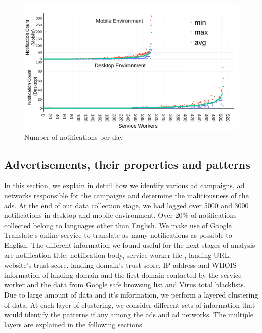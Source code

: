 
\begin{figure}[h]
\includegraphics[width=\columnwidth]{figs/avg_notifications.pdf}
\caption{Number of notifications per day}
\label{notification_per_day}
\end{figure}

\subsection{Advertisements, their properties and patterns}
In this section, we explain in detail how we identify various ad campaigns, ad networks responsible for the campaigns and determine the maliciousness of the ads. At the end of our data collection stage, we had logged over 5000 and 3000 notifications in desktop and mobile environment. Over 20\% of notifications collected belong to languages other than English. We make use of Google Translate's online service to translate as many notifications as possible to English. The different information we found useful for the next stages of analysis are notification title, notification body, service worker file , landing URL, website's trust score, landing domain's trust score, IP address and WHOIS information of landing domain and the first domain contacted by the service worker and the data from Google safe browsing list and Virus total blacklists. Due to large amount of data and it's information, we perform a layered clustering of data. At each layer of clustering, we consider different sets of information that would identify the patterns if any among the ads and ad networks. The multiple layers are explained in the following sections

